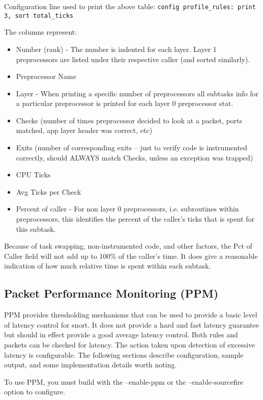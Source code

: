 \documentclass[english]{report}
\begin{document}
Configuration line used to print the above table: 
\subitem \texttt{config profile\_rules: print 3, sort total\_ticks}

The columns represent:
\begin{itemize}
\item Number (rank) - The number is indented for each layer.  Layer 1 preprocessors are
  listed under their respective caller (and sorted similarly).
\item Preprocessor Name
\item Layer - When printing a specific number of preprocessors all subtasks info
for a particular preprocessor is printed for each layer 0 preprocessor stat.
\item Checks (number of times preprocessor decided to look at a packet,
  ports matched, app layer header was correct, etc)
\item Exits  (number of corresponding exits -- just to verify code is
  instrumented correctly, should ALWAYS match Checks, unless an
  exception was trapped)
\item CPU Ticks
\item Avg Ticks per Check
\item Percent of caller - For non layer 0 preprocessors, i.e. subroutines within preprocessors,
  this identifies the percent of the caller's ticks that is spent for
  this subtask.
\end{itemize}

Because of task swapping, non-instrumented code, and other factors, the
Pct of Caller field will not add up to 100\% of the caller's time.
It does give a reasonable indication of how much relative time is
spent within each subtask.

\subsection{Packet Performance Monitoring (PPM)\label{ppm}}
PPM provides thresholding mechanisms that can be used to provide a basic
level of latency control for snort.  It does not provide a hard and fast
latency guarantee but should in effect provide a good average latency
control.  Both rules and packets can be checked for latency.  The action
taken upon detection of excessive latency is configurable.  The following
sections describe configuration, sample output, and some implementation
details worth noting.

To use PPM, you must build with the --enable-ppm or the --enable-sourcefire
option to configure.
\end{document}
